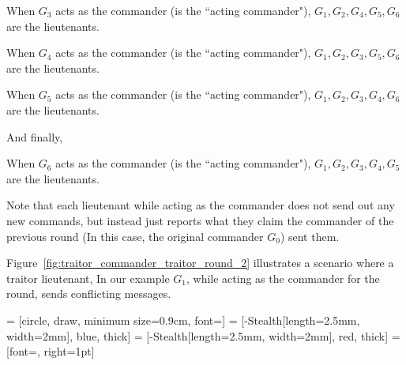 \documentclass[11pt]{article}
\newcommand{\gen}[1]{\ensuremath{G_{#1}}}
\begin{document}
When $\gen{3}$ acts as the commander (is the ``acting commander"),  $\gen{1}, \gen{2}, \gen{4}, \gen{5}, \gen{6}$ are the lieutenants.

When $\gen{4}$ acts as the commander (is the ``acting commander"),  $\gen{1}, \gen{2}, \gen{3}, \gen{5}, \gen{6}$ are the lieutenants.

When $\gen{5}$ acts as the commander (is the ``acting commander"),  $\gen{1}, \gen{2}, \gen{3}, \gen{4}, \gen{6}$ are the lieutenants.

And finally,

When $\gen{6}$ acts as the commander (is the ``acting commander"),  $\gen{1}, \gen{2}, \gen{3}, \gen{4}, \gen{5}$ are the lieutenants.



Note that each lieutenant while acting as the commander does not send out any new commands, but instead just reports what they claim the commander of the previous round (In this case, the original commander $\gen{0}$) sent them.

Figure~\ref{fig:traitor_commander_traitor_round_2} illustrates a scenario where a traitor lieutenant, In our example $\gen{1}$, while acting as the commander for the round, sends conflicting messages.


 = [circle, draw, minimum size=0.9cm, font=\small]
 = [-{Stealth[length=2.5mm, width=2mm]}, blue, thick] %
 = [-{Stealth[length=2.5mm, width=2mm]}, red, thick]  %
 = [font=\scriptsize, right=1pt]
\end{document}
